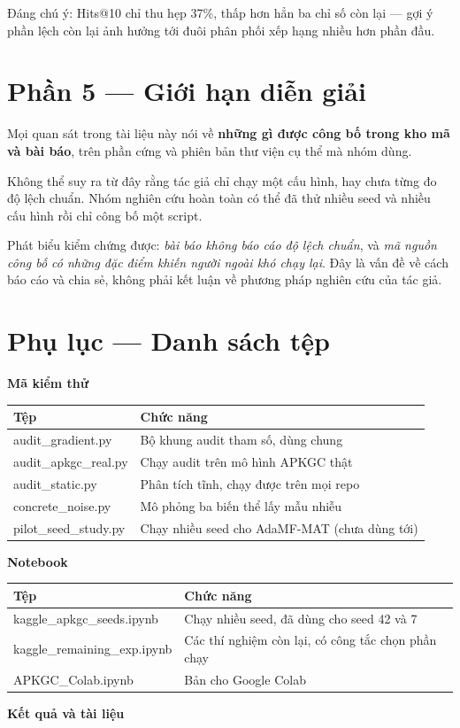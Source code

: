 \documentclass[11pt,a4paper]{article}
\newcommand{\code}[1]{{\ttfamily\small\color{codetext}#1}}
\begin{document}
Đáng chú ý: Hits@10 chỉ thu hẹp 37\%, thấp hơn hẳn ba chỉ số còn lại --- gợi ý phần lệch còn lại ảnh hưởng tới đuôi phân phối xếp hạng nhiều hơn phần đầu.

\section{Phần 5 --- Giới hạn diễn giải}
Mọi quan sát trong tài liệu này nói về \textbf{những gì được công bố trong kho mã và bài báo}, trên phần cứng và phiên bản thư viện cụ thể mà nhóm dùng.

Không thể suy ra từ đây rằng tác giả chỉ chạy một cấu hình, hay chưa từng đo độ lệch chuẩn. Nhóm nghiên cứu hoàn toàn có thể đã thử nhiều seed và nhiều cấu hình rồi chỉ công bố một script.

Phát biểu kiểm chứng được: \emph{bài báo không báo cáo độ lệch chuẩn}, và \emph{mã nguồn công bố có những đặc điểm khiến người ngoài khó chạy lại}. Đây là vấn đề về cách báo cáo và chia sẻ, không phải kết luận về phương pháp nghiên cứu của tác giả.

\section{Phụ lục --- Danh sách tệp}
\textbf{Mã kiểm thử}

\begin{center}\small
\begin{tabular}{@{}ll@{}}
\toprule
\textbf{Tệp} & \textbf{Chức năng}\\
\midrule
\code{audit\_gradient.py} & Bộ khung audit tham số, dùng chung\\
\code{audit\_apkgc\_real.py} & Chạy audit trên mô hình APKGC thật\\
\code{audit\_static.py} & Phân tích tĩnh, chạy được trên mọi repo\\
\code{concrete\_noise.py} & Mô phỏng ba biến thể lấy mẫu nhiễu\\
\code{pilot\_seed\_study.py} & Chạy nhiều seed cho AdaMF-MAT (chưa dùng tới)\\
\bottomrule
\end{tabular}
\end{center}
\textbf{Notebook}

\begin{center}\small
\begin{tabular}{@{}ll@{}}
\toprule
\textbf{Tệp} & \textbf{Chức năng}\\
\midrule
\code{kaggle\_apkgc\_seeds.ipynb} & Chạy nhiều seed, đã dùng cho seed 42 và 7\\
\code{kaggle\_remaining\_exp.ipynb} & Các thí nghiệm còn lại, có công tắc chọn phần chạy\\
\code{APKGC\_Colab.ipynb} & Bản cho Google Colab\\
\bottomrule
\end{tabular}
\end{center}
\textbf{Kết quả và tài liệu}
\end{document}
